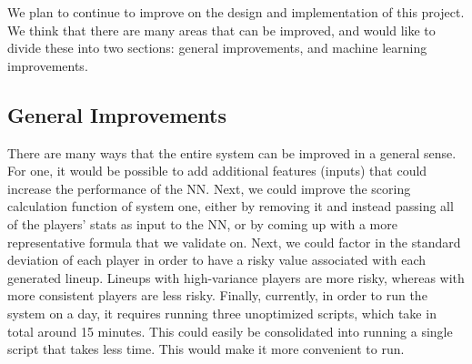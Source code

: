
We plan to continue to improve on the design and implementation of this project. We think that there are many areas that can be improved, and would like to divide these into two sections: general improvements, and machine learning improvements.

\subsection{General Improvements}
There are many ways that the entire system can be improved in a general sense. For one, it would be possible to add additional features (inputs) that could increase the performance of the NN. Next, we could improve the scoring calculation function of system one, either by removing it and instead passing all of the players' stats as input to the NN, or by coming up with a more representative formula that we validate on. Next, we could factor in the standard deviation of each player in order to have a risky value associated with each generated lineup. Lineups with high-variance players are more risky, whereas with more consistent players are less risky. Finally, currently, in order to run the system on a day, it requires running three unoptimized scripts, which take in total around 15 minutes. This could easily be consolidated into running a single script that takes less time. This would make it more convenient to run. 

